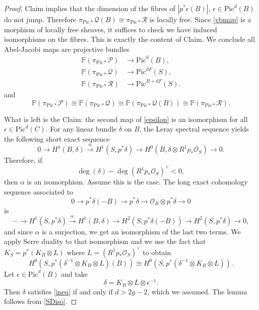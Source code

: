 \documentclass{amsart}
\theoremstyle{definition}
\newcommand{\PP} {\mathbb{P}}
\renewcommand{\O}{\mathcal{O}}
\newcommand{\Pic}{\mathrm{Pic}}
\newcommand{\rt}[1]{\stackrel{#1\,}{\rightarrow}}
\newcommand{\cQ}{\mathcal{Q}}
\newcommand{\cR}{\mathcal{R}}
\begin{document}
\begin{proof}
Claim implies that the dimension of the fibres of $|p^* \epsilon(B)|$, $\epsilon \in \Pic^d(B)$ do not jump. Therefore $\pi_{\Pic *} \cQ(B) \cong \pi_{\Pic *} \cR$ is locally free. Since \eqref{vbmap} is a morphism of locally free sheaves, it suffices to check we have induced isomorphisms on the fibres. This is exactly the content of Claim. We conclude all Abel-Jacobi maps are projective bundles 
\begin{align*}
\PP(\pi_{\Pic *} \mathcal{P}) &\rightarrow \Pic^d(B), \\
\PP(\pi_{\Pic *} \mathcal{Q}) &\rightarrow \Pic^{dF}(S), \\
\PP(\pi_{\Pic *} \mathcal{R}) &\rightarrow \Pic^{B+dF}(S).
\end{align*}
and 
$$
\PP(\pi_{\Pic *} \mathcal{P}) \cong \PP(\pi_{\Pic *} \mathcal{Q}) \cong \PP(\pi_{\Pic *} \mathcal{Q}(B)) \cong \PP(\pi_{\Pic *} \mathcal{R}).
$$

What is left is the Claim: the second map of \eqref{epsilon} is an isomorphism for all $\epsilon \in \Pic^d(C)$. For any linear bundle $\delta$ on $B$, the Leray spectral sequence yields the following short exact sequence
\[
0\to H^{1} (B,\delta ) \stackrel{\alpha}{\longrightarrow} H^{1} (S,p^{*}\delta ) \longrightarrow H^{0} (B,\delta \otimes R^{1}p _{*}\O_S ) \to 0.
\]
Therefore, if
\begin{equation} \label{ineq}
\deg( \delta) - \deg (R^1 p_* \O_S)^\vee < 0,
\end{equation}
then $\alpha$ is an isomorphism. Assume this is the case. The long exact cohomology sequence associated to 
\[
0\to p^{*}\delta (-B)\to p^{*}\delta \to \O _{B}\otimes p^{*}\delta \to 0
\]
is
\[
\dotsb \to H^{1} (S,p ^{*} \delta )\rt{\alpha }H^{1} (B,\delta )\to H^{2} (S,p ^{*}\delta (-B))\to H^{2} (S,p ^{*}\delta )\to 0,
\]
and since $\alpha $ is a surjection, we get an isomorphism of the last
two terms. We apply Serre duality to that isomorphism and we use the
fact that $K_{S} = p ^{*} (K_{B}\otimes L)$ where $L = \left(R^1 p
_{*}\O _{S} \right)^{\vee }$ \cite[Thm.~12.1]{BPV} to obtain
\begin{equation} \label{SDiso}
H^{0} (S,p ^{*} (\delta ^{-1}\otimes K_{B}\otimes L) (B)) \cong H^{0}(S,p ^{*} (\delta ^{-1}\otimes K_{B}\otimes L)).
\end{equation}
Let $\epsilon \in \Pic^d(B)$ and take
$$
\delta =K_{B}\otimes L\otimes \epsilon ^{-1}.
$$
Then $\delta$ satisfies \eqref{ineq} if and only if $d>2g-2$, which we assumed. The lemma follows from \eqref{SDiso}.
\end{proof}
\end{document}
